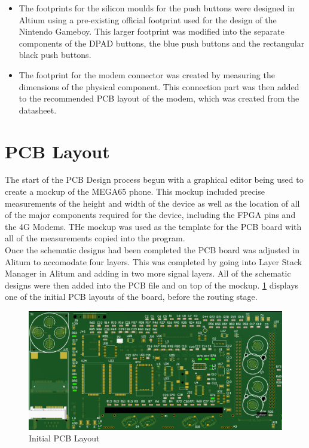 \begin{itemize}
\item The footprints for the silicon moulds for the push buttons were designed in Altium using a pre-existing official footprint used for the design of the Nintendo Gameboy. This larger footprint was modified into the separate components of the DPAD buttons, the blue push buttons and the rectangular black push buttons.
\item The footprint for the modem connector was created by measuring the dimensions of the physical component. This connection part was then added to the recommended PCB layout of the modem, which was created from the datasheet. 
\end{itemize}

\section{PCB Layout}

	The start of the PCB Design process begun with a graphical editor being used to create a mockup of the MEGA65 phone. This mockup included precise measurements of the height and width of the device as well as the location of all of the major components required for the device, including the FPGA pins and the 4G Modems. THe mockup was used as the template for the PCB board with all of the measurements copied into the program. \\
	Once the schematic designs had been completed the PCB board was adjusted in Alitum to accomodate four layers. This was completed by going into Layer Stack Manager in Alitum and adding in two more signal layers. All of the schematic designs were then added into the PCB file and on top of the mockup. \ref{fig:Initial_PCB} displays one of the initial PCB layouts of the board, before the routing stage.\\

\begin{figure}
	\includegraphics[width=\linewidth]{Figures/PCB.png}
	\caption{Initial PCB Layout}
	\label{fig:Initial_PCB}
\end{figure}

